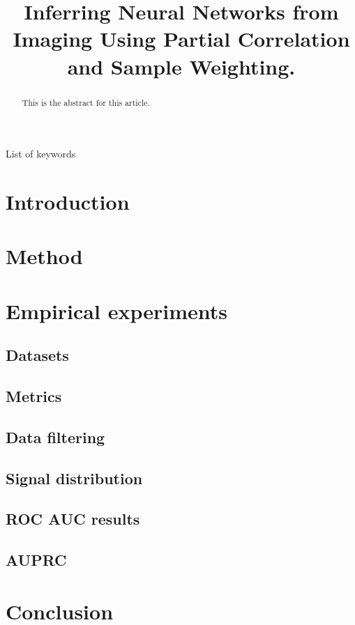 \documentclass[wcp]{jmlr}
\title[Connectomics challenge]{Inferring Neural Networks from Imaging Using Partial Correlation and Sample Weighting.}
\author{}
\begin{document}
\maketitle

\begin{abstract}
This is the abstract for this article.
\end{abstract}

\begin{keywords}
List of keywords
\end{keywords}


\section{Introduction}\label{sec:intro}

\section{Method}

\section{Empirical experiments}
\subsection{Datasets}
\subsection{Metrics}
\subsection{Data filtering}
\subsection{Signal distribution}
\subsection{ROC AUC results}
\subsection{AUPRC}

\section{Conclusion}




\end{document}
